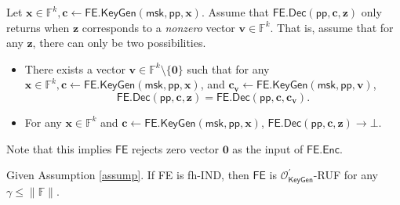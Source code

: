 \begin{assumption}
\label{assump}
Let $\mathbf{x} \in \mathbb{F}^k, \mathbf{c} \gets \textsf{FE.KeyGen}(\textsf{msk}, \textsf{pp}, \mathbf{x})$. Assume that $\textsf{FE.Dec}(\textsf{pp}, \mathbf{c}, \mathbf{z})$ only returns when $\mathbf{z}$ corresponds to a \emph{nonzero} vector $\mathbf{v} \in \mathbb{F}^k$. That is, assume that for any $\mathbf{z}$, there can only be two possibilities.

\begin{itemize}
	\item There exists a vector $\mathbf{v} \in \mathbb{F}^k \setminus \{\mathbf{0}\}$ such that for any $\mathbf{x} \in \mathbb{F}^k, \mathbf{c} \gets \textsf{FE.KeyGen}(\textsf{msk}, \textsf{pp}, \mathbf{x})$, and $\mathbf{c_v} \gets \textsf{FE.KeyGen}(\textsf{msk}, \textsf{pp}, \mathbf{v})$, 
	\[
		\textsf{FE.Dec}(\textsf{pp}, \mathbf{c}, \mathbf{z}) = \textsf{FE.Dec}(\textsf{pp}, \mathbf{c}, \mathbf{c_v}).
	\]
	\item For any $\mathbf{x} \in \mathbb{F}^k$ and $ \mathbf{c} \gets \textsf{FE.KeyGen}(\textsf{msk}, \textsf{pp}, \mathbf{x})$, $\textsf{FE.Dec}(\textsf{pp}, \mathbf{c}, \mathbf{z}) \to \bot$.

\end{itemize}
Note that this implies $\textsf{FE}$ rejects zero vector $\mathbf{0}$ as the input of $\textsf{FE.Enc}$.
\end{assumption}

\begin{theorem}
\label{thm:fh-IPFE:ind-ruf}
Given Assumption \ref{assump}. If \textsf{FE} is fh-IND, then $\textsf{FE}$ is $\mathcal{O}^\prime_{\textsf{KeyGen}}$-RUF for any $\gamma \leq \|\mathbb{F}\|$.

\end{theorem}

